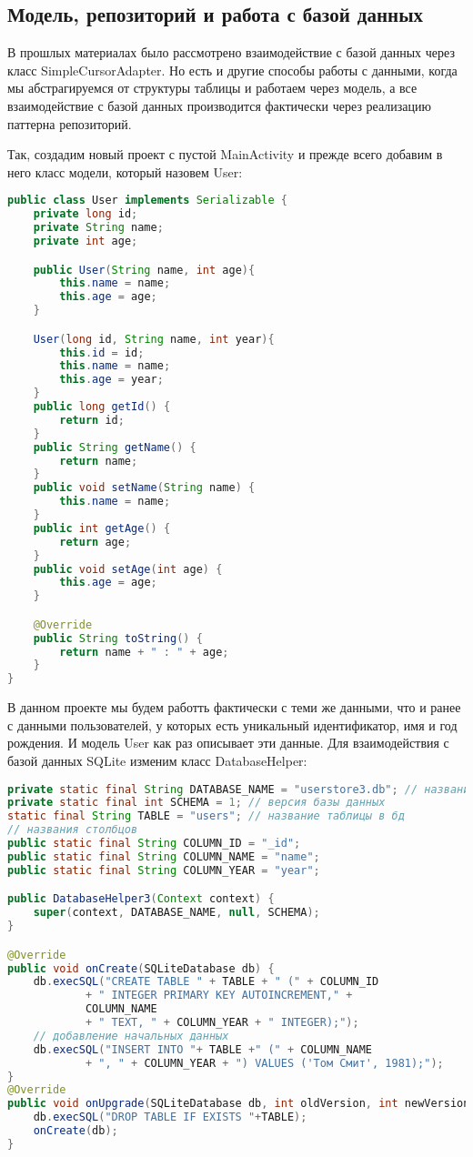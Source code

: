 \subsection{Модель, репозиторий и работа с базой данных}
В прошлых материалах было рассмотрено взаимодействие с базой данных
через класс SimpleCursorAdapter. Но есть и другие способы работы с
данными, когда мы абстрагируемся от структуры таблицы и работаем через
модель, а все взаимодействие с базой данных производится фактически через
реализацию паттерна репозиторий.\par
Так, создадим новый проект с пустой MainActivity и прежде всего добавим в
него класс модели, который назовем User:

\begin{lstlisting}[language=Java
	, label=lst:
	]
public class User implements Serializable {
	private long id;
	private String name;
	private int age;

	public User(String name, int age){
		this.name = name;
		this.age = age;
	}

	User(long id, String name, int year){
		this.id = id;
		this.name = name;
		this.age = year;
	}
	public long getId() {
		return id;
	}
	public String getName() {
		return name;
	}
	public void setName(String name) {
		this.name = name;
	}
	public int getAge() {
		return age;
	}
	public void setAge(int age) {
		this.age = age;
	}

	@Override
	public String toString() {
		return name + " : " + age;
	}
}
\end{lstlisting}

В данном проекте мы будем работть фактически с теми же данными, что и
ранее с данными пользователей, у которых есть уникальный идентификатор,
имя и год рождения. И модель User как раз описывает эти данные.
Для взаимодействия с базой данных SQLite изменим класс
DatabaseHelper:

\begin{lstlisting}[language=Java
	, label=lst:
	]
private static final String DATABASE_NAME = "userstore3.db"; // название бд
private static final int SCHEMA = 1; // версия базы данных
static final String TABLE = "users"; // название таблицы в бд
// названия столбцов
public static final String COLUMN_ID = "_id";
public static final String COLUMN_NAME = "name";
public static final String COLUMN_YEAR = "year";

public DatabaseHelper3(Context context) {
	super(context, DATABASE_NAME, null, SCHEMA);
}

@Override
public void onCreate(SQLiteDatabase db) {
	db.execSQL("CREATE TABLE " + TABLE + " (" + COLUMN_ID
			+ " INTEGER PRIMARY KEY AUTOINCREMENT," +
			COLUMN_NAME
			+ " TEXT, " + COLUMN_YEAR + " INTEGER);");
	// добавление начальных данных
	db.execSQL("INSERT INTO "+ TABLE +" (" + COLUMN_NAME
			+ ", " + COLUMN_YEAR + ") VALUES ('Том Смит', 1981);");
}
@Override
public void onUpgrade(SQLiteDatabase db, int oldVersion, int newVersion) {
	db.execSQL("DROP TABLE IF EXISTS "+TABLE);
	onCreate(db);
}
\end{lstlisting}

